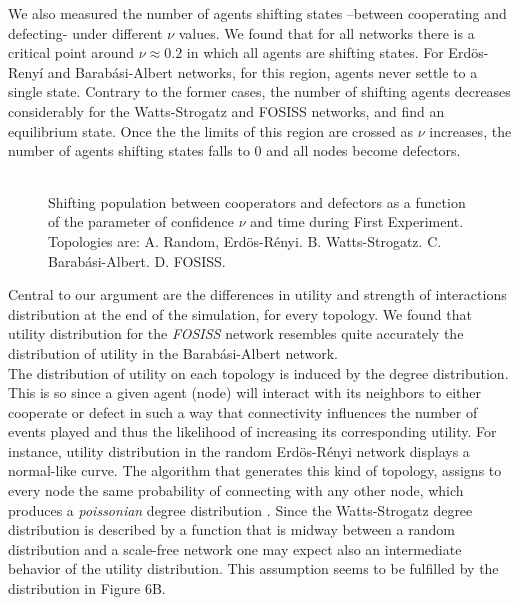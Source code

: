 \documentclass{bmcart}
\def\texttt{[image: ]}
\begin{document}

We also measured the number of agents shifting states --between cooperating and
defecting- under different $\nu$ values. We found that for all networks there is
a critical point around  $\nu \approx 0.2$ in which all agents are shifting
states. For Erd\"{o}s-Reny\'i and Barab\'asi-Albert networks, for this region,
agents never settle to a single state. Contrary to the former cases, the number
of shifting agents decreases considerably for the Watts-Strogatz and FOSISS
networks, and find an equilibrium state. Once the the limits of this region are
crossed as $\nu$ increases, the number of agents shifting states falls to $0$
and all nodes become defectors. \\


\begin{figure} [h!]
\centering
\begin{tabular}{cc}

\end{tabular}
\caption{Shifting population between cooperators and defectors as a function of
the parameter
  of confidence $\nu$ and time during First Experiment. Topologies are:
  A. Random,
  Erd\"{o}s-R\'enyi. B. Watts-Strogatz. C. Barab\'asi-Albert. D. FOSISS.}\label{state}  
\end{figure}


Central to our argument are the differences in utility and strength of
interactions distribution at the end of the simulation, for every topology. We
found that utility distribution for the \textit{FOSISS} network resembles quite
accurately the distribution of utility in the Barab\'asi-Albert
network.\\ 


The distribution of utility on each topology is induced by the degree
distribution. This is so since a given agent (node) will interact with its
neighbors to either cooperate or defect in such a way that connectivity
influences the number of events played and thus the likelihood of increasing its
corresponding utility. For instance, utility distribution in the random
Erd\"{o}s-R\'enyi network displays a normal-like curve. The algorithm that
generates this kind of topology, assigns to every node the same probability of
connecting with any other node, which produces a \textit{poissonian} degree
distribution \cite{ErdosRenyi:59}. Since the Watts-Strogatz degree distribution is
described by a function that is midway between a random distribution and a
scale-free network \cite{Barratmodels:2000} one may expect also  an intermediate
behavior of the utility distribution. This assumption seems to be fulfilled by
the distribution in Figure 6B. \\
\end{document}
